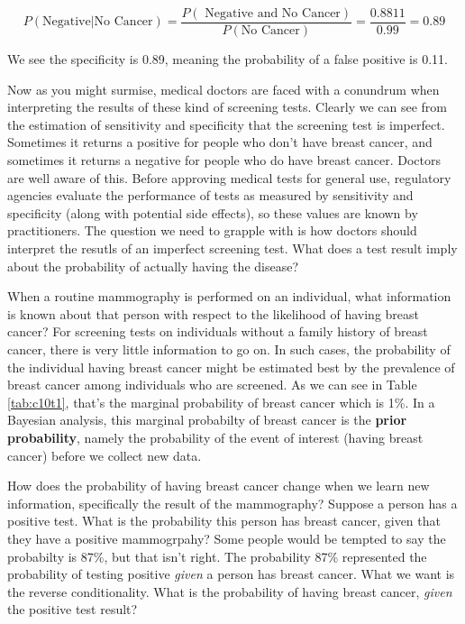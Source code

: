 \documentclass[
]{book}
\begin{document}
\[
P(\text{Negative}|\text{No Cancer}) = \frac{P(\text{ Negative and No Cancer})}{P(\text{No Cancer})} = \frac{0.8811}{0.99}=0.89
\]

We see the specificity is 0.89, meaning the probability of a false
positive is 0.11.

Now as you might surmise, medical doctors are faced with a conundrum
when interpreting the results of these kind of screening tests. Clearly
we can see from the estimation of sensitivity and specificity that the
screening test is imperfect. Sometimes it returns a positive for people
who don't have breast cancer, and sometimes it returns a negative for
people who do have breast cancer. Doctors are well aware of this. Before
approving medical tests for general use, regulatory agencies evaluate
the performance of tests as measured by sensitivity and specificity
(along with potential side effects), so these values are known by
practitioners. The question we need to grapple with is how doctors
should interpret the resutls of an imperfect screening test. What does a
test result imply about the probability of actually having the disease?

When a routine mammography is performed on an individual, what
information is known about that person with respect to the likelihood of
having breast cancer? For screening tests on individuals without a
family history of breast cancer, there is very little information to go
on. In such cases, the probability of the individual having breast
cancer might be estimated best by the prevalence of breast cancer among
individuals who are screened. As we can see in Table \ref{tab:c10t1},
that's the marginal probability of breast cancer which is 1\%. In a
Bayesian analysis, this marginal probabilty of breast cancer is the
\textbf{prior probability}, namely the probability of the event of interest
(having breast cancer) before we collect new data.

How does the probability of having breast cancer change when we learn
new information, specifically the result of the mammography? Suppose a
person has a positive test. What is the probability this person has
breast cancer, given that they have a positive mammogrpahy? Some people
would be tempted to say the probabilty is 87\%, but that isn't right. The
probability 87\% represented the probability of testing positive \emph{given}
a person has breast cancer. What we want is the reverse conditionality.
What is the probability of having breast cancer, \emph{given} the positive
test result?
\end{document}
